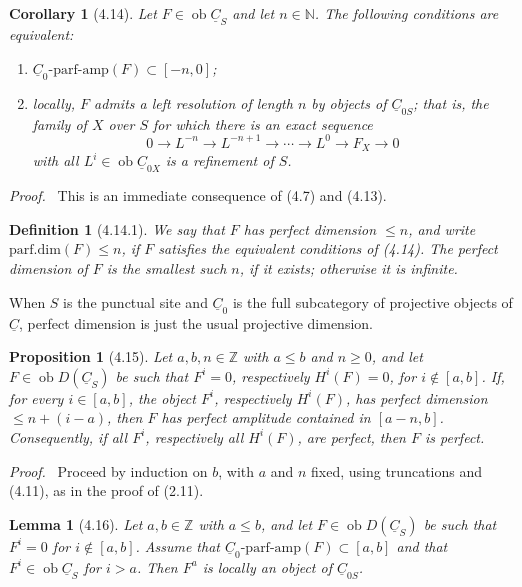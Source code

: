 \documentclass[13pt]{extarticle}
\newcommand{\ZZ}{\mathbb Z}
\newcommand{\NN}{\mathbb N}
\newcommand{\uC}{\underline C}
\newcommand{\ob}{\operatorname{ob}}
\newenvironment{prooftext}[1][Proof]{\par\noindent\emph{#1.}\ }{\par\medskip}
\newtheorem*{lemma*}{Lemma}
\newtheorem*{proposition*}{Proposition}
\newtheorem*{corollary*}{Corollary}
\newtheorem*{definition*}{Definition}
\begin{document}
\begin{corollary*}[4.14]
Let $F\in\ob\uC_S$ and let $n\in\NN$. The following conditions are equivalent:
\begin{enumerate}[label=(\roman*)]
\item $\uC_0\text{-parf-amp}(F)\subset[-n,0]$;
\item locally, $F$ admits a left resolution of length $n$ by objects of $\uC_{0S}$; that is, the family of $X$ over $S$ for which there is an exact sequence
\[
0\longrightarrow L^{-n}\longrightarrow L^{-n+1}\longrightarrow\cdots\longrightarrow L^0\longrightarrow F_X\longrightarrow0
\]
with all $L^i\in\ob\uC_{0X}$ is a refinement of $S$.
\end{enumerate}
\end{corollary*}

\begin{prooftext}
This is an immediate consequence of (4.7) and (4.13).
\end{prooftext}

\begin{definition*}[4.14.1]
We say that $F$ has \emph{perfect dimension} $\leq n$, and write $\mathrm{parf.dim}(F)\leq n$, if $F$ satisfies the equivalent conditions of (4.14). The perfect dimension of $F$ is the smallest such $n$, if it exists; otherwise it is infinite.
\end{definition*}

When $S$ is the punctual site and $\uC_0$ is the full subcategory of projective objects of $\uC$, perfect dimension is just the usual projective dimension.

\begin{proposition*}[4.15]
Let $a,b,n\in\ZZ$ with $a\leq b$ and $n\geq0$, and let $F\in\ob D(\uC_S)$ be such that $F^i=0$, respectively $H^i(F)=0$, for $i\notin[a,b]$. If, for every $i\in[a,b]$, the object $F^i$, respectively $H^i(F)$, has perfect dimension $\leq n+(i-a)$, then $F$ has perfect amplitude contained in $[a-n,b]$. Consequently, if all $F^i$, respectively all $H^i(F)$, are perfect, then $F$ is perfect.
\end{proposition*}

\begin{prooftext}
Proceed by induction on $b$, with $a$ and $n$ fixed, using truncations and (4.11), as in the proof of (2.11).
\end{prooftext}

\begin{lemma*}[4.16]
Let $a,b\in\ZZ$ with $a\leq b$, and let $F\in\ob D(\uC_S)$ be such that $F^i=0$ for $i\notin[a,b]$. Assume that $\uC_0\text{-parf-amp}(F)\subset[a,b]$ and that $F^i\in\ob\uC_S$ for $i>a$. Then $F^a$ is locally an object of $\uC_{0S}$.
\end{lemma*}
\end{document}
